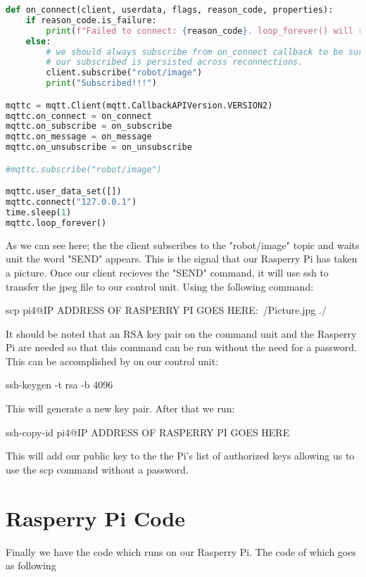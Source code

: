 \documentclass[12pt,a4paper]{article}
\begin{document}
\begin{lstlisting}[language=Python, caption=Command Unit Code]
def on_connect(client, userdata, flags, reason_code, properties):
    if reason_code.is_failure:
        print(f"Failed to connect: {reason_code}. loop_forever() will retry connection")
    else:
        # we should always subscribe from on_connect callback to be sure
        # our subscribed is persisted across reconnections.
        client.subscribe("robot/image")
        print("Subscribed!!!")

mqttc = mqtt.Client(mqtt.CallbackAPIVersion.VERSION2)
mqttc.on_connect = on_connect
mqttc.on_subscribe = on_subscribe
mqttc.on_message = on_message
mqttc.on_unsubscribe = on_unsubscribe

#mqttc.subscribe("robot/image")

mqttc.user_data_set([])
mqttc.connect("127.0.0.1")
time.sleep(1)
mqttc.loop_forever()

\end{lstlisting}

As we can see here; the the client subscribes to the "robot/image" topic and waits unit the word "SEND" appears. This is the signal that our Rasperry Pi has taken a picture.
Once our client recieves the "SEND" command, it will use ssh to transfer the jpeg file to our control unit.
Using the following command:

scp pi4@IP ADDRESS OF RASPERRY PI GOES HERE:~/Picture.jpg ./

It should be noted that an RSA key pair on the command unit and the Rasperry Pi are needed so that this command can be run without the need for a password.
This can be accomplished by  on our control unit:

ssh-keygen -t rsa -b 4096

This will generate a new key pair.
After that we run:

ssh-copy-id pi4@IP ADDRESS OF RASPERRY PI GOES HERE

This will add our public key to the the Pi's list of authorized keys allowing us to use the scp command without a password.

\clearpage

\newpage

\section{ Rasperry Pi Code }

Finally we have the code which runs on our Rasperry Pi.
The code of which goes as following
\end{document}
